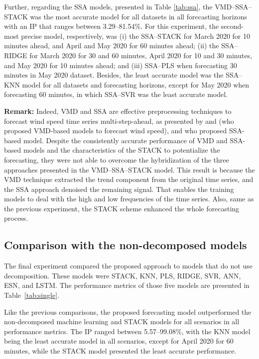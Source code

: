 Further, regarding the \ac{SSA} models, presented in Table \ref{tab:ssa}, the \ac{VMD}--\ac{SSA}--\ac{STACK} was the most accurate model for all datasets in all forecasting horizons with an \ac{IP} that ranges between 3.29--81.54\%. For this experiment, the second-most precise model, respectively, was (i) the \ac{SSA}--\ac{STACK} for March 2020 for 10 minutes ahead, and April and May 2020 for 60 minutes ahead; (ii) the \ac{SSA}--\ac{RIDGE} for March 2020 for 30 and 60 minutes, April 2020 for 10 and 30 minutes, and May 2020 for 10 minutes ahead; and (iii) \ac{SSA}--\ac{PLS} when forecasting 30 minutes in May 2020 dataset. Besides, the least accurate model was the \ac{SSA}--\ac{KNN} model for all datasets and forecasting horizons, except for May 2020 when forecasting 60 minutes, in which \ac{SSA}--\ac{SVR} was the least accurate model.

\textbf{Remark:} Indeed, \ac{VMD} and \ac{SSA} are effective preprocessing techniques to forecast wind speed time series multi-step-ahead, as presented by  and  (who proposed \ac{VMD}-based models to forecast wind speed), and  who proposed \ac{SSA}-based model. Despite the consistently accurate performance of \ac{VMD} and \ac{SSA}-based models \cite{moreno2018Wind, zhang2021Hybrid} and the characteristics of the \ac{STACK} to potentialize the forecasting, they were not able to overcome the hybridization of the three approaches presented in the \ac{VMD}--\ac{SSA}--\ac{STACK} model. This result is because the \ac{VMD} technique extracted the trend component from the original time series, and the \ac{SSA} approach denoised the remaining signal. That enables the training models to deal with the high and low frequencies of the time series. Also, same as the previous experiment, the \ac{STACK} scheme enhanced the whole forecasting process.

\subsection{Comparison with the non-decomposed models \label{subsec:nondec}}
The final experiment compared the proposed approach to models that do not use decomposition. These models were \ac{STACK}, \ac{KNN}, \ac{PLS}, \ac{RIDGE}, \ac{SVR}, \ac{ANN}, \ac{ESN}, and \ac{LSTM}. The performance metrics of those five models are presented in Table~\ref{tab:single}.

Like the previous comparisons, the proposed forecasting model outperformed the non-decomposed machine learning and \ac{STACK} models for all scenarios in all performance metrics. The \ac{IP} ranged between 5.57--99.08\%, with the \ac{KNN} model being the least accurate model in all scenarios, except for April 2020 for 60 minutes, while the \ac{STACK} model presented the least accurate performance.


